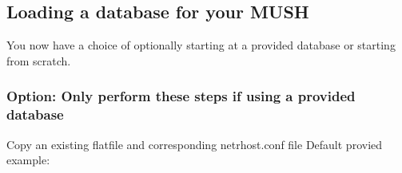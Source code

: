\documentclass[letterpaper,10pt,english]{sphinxmanual}
\begin{document}
\subsection{Loading a database for your MUSH}
\label{\detokenize{install:loading-a-database-for-your-mush}}
\sphinxAtStartPar
You now have a choice of optionally starting at a provided database or starting from scratch.


\subsubsection{Option: Only perform these steps if using a provided database}
\label{\detokenize{install:option-only-perform-these-steps-if-using-a-provided-database}}
\sphinxAtStartPar
Copy an existing flatfile and corresponding netrhost.conf file Default provied example:

\begin{sphinxVerbatim}[commandchars=\\\{\}]
  
   
 
   
\end{sphinxVerbatim}
\end{document}
